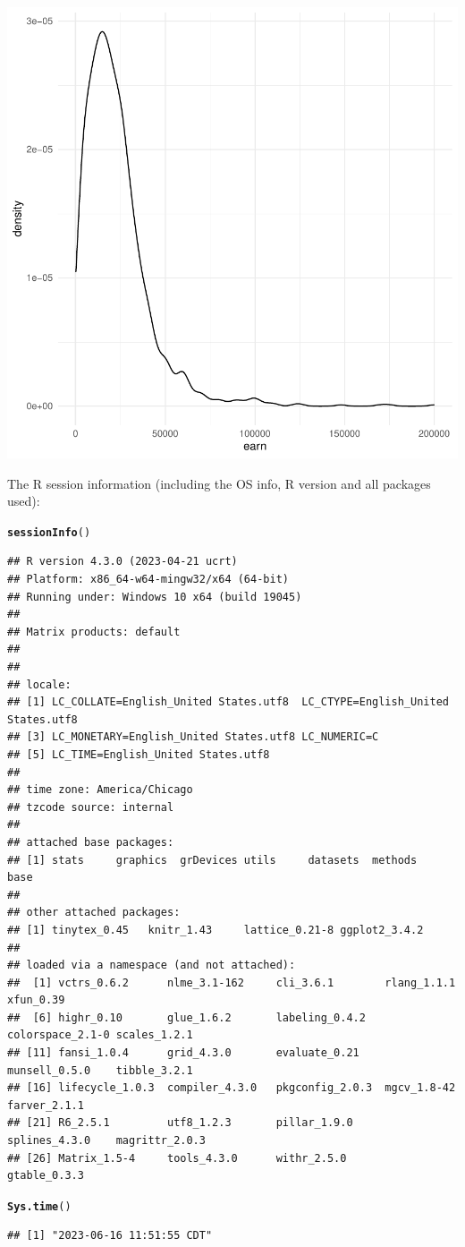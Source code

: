\documentclass{article}\usepackage[]{graphicx}\usepackage[]{xcolor}
\makeatletter
\newcommand{\hlstd}[1]{\textcolor[rgb]{0.345,0.345,0.345}{#1}}%
\newcommand{\hlkwd}[1]{\textcolor[rgb]{0.737,0.353,0.396}{\textbf{#1}}}%
\newenvironment{kframe}{%
 \def\at@end@of@kframe{}%
 \ifinner\ifhmode%
  \def\at@end@of@kframe{\end{minipage}}%
  \begin{minipage}{\columnwidth}%
 \fi\fi%
 \def\FrameCommand##1{\hskip\@totalleftmargin \hskip-\fboxsep
 \colorbox{shadecolor}{##1}\hskip-\fboxsep
     \hskip-\linewidth \hskip-\@totalleftmargin \hskip\columnwidth}%
 \MakeFramed {\advance\hsize-\width
   \@totalleftmargin\z@ \linewidth\hsize
   \@setminipage}}%
 {\par\unskip\endMakeFramed%
 \at@end@of@kframe}
\newenvironment{knitrout}{}{} %
\makeatother
\begin{document}
\begin{knitrout}
{\centering \includegraphics[width=.6\linewidth]{figure/assignment-03-TangXin-Rnwauto-report-11} 

}


\end{knitrout}

The R session information (including the OS info, R version and all
packages used):

\begin{knitrout}
\color{fgcolor}\begin{kframe}
\begin{alltt}
\hlkwd{sessionInfo}\hlstd{()}
\end{alltt}
\begin{verbatim}
## R version 4.3.0 (2023-04-21 ucrt)
## Platform: x86_64-w64-mingw32/x64 (64-bit)
## Running under: Windows 10 x64 (build 19045)
## 
## Matrix products: default
## 
## 
## locale:
## [1] LC_COLLATE=English_United States.utf8  LC_CTYPE=English_United States.utf8   
## [3] LC_MONETARY=English_United States.utf8 LC_NUMERIC=C                          
## [5] LC_TIME=English_United States.utf8    
## 
## time zone: America/Chicago
## tzcode source: internal
## 
## attached base packages:
## [1] stats     graphics  grDevices utils     datasets  methods   base     
## 
## other attached packages:
## [1] tinytex_0.45   knitr_1.43     lattice_0.21-8 ggplot2_3.4.2 
## 
## loaded via a namespace (and not attached):
##  [1] vctrs_0.6.2      nlme_3.1-162     cli_3.6.1        rlang_1.1.1      xfun_0.39       
##  [6] highr_0.10       glue_1.6.2       labeling_0.4.2   colorspace_2.1-0 scales_1.2.1    
## [11] fansi_1.0.4      grid_4.3.0       evaluate_0.21    munsell_0.5.0    tibble_3.2.1    
## [16] lifecycle_1.0.3  compiler_4.3.0   pkgconfig_2.0.3  mgcv_1.8-42      farver_2.1.1    
## [21] R6_2.5.1         utf8_1.2.3       pillar_1.9.0     splines_4.3.0    magrittr_2.0.3  
## [26] Matrix_1.5-4     tools_4.3.0      withr_2.5.0      gtable_0.3.3
\end{verbatim}
\begin{alltt}
\hlkwd{Sys.time}\hlstd{()}
\end{alltt}
\begin{verbatim}
## [1] "2023-06-16 11:51:55 CDT"
\end{verbatim}
\end{kframe}
\end{knitrout}
\end{document}
